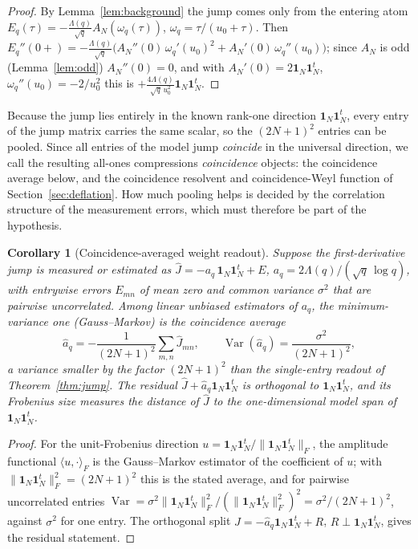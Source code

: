 \documentclass[11pt]{article}
\theoremstyle{plain}
\newtheorem{corollary}[theorem]{Corollary}
\theoremstyle{definition}
\theoremstyle{remark}
\newcommand{\one}{\mathbf 1}
\newcommand{\Lam}{\Lambda}
\begin{document}
\begin{proof}
By Lemma~\ref{lem:background} the jump comes only from the entering atom
$E_q(\tau)=-\tfrac{\Lam(q)}{\sqrt q}A_N(\omega_q(\tau))$, $\omega_q=\tau/(u_0+\tau)$.
Then $E_q''(0+)=-\tfrac{\Lam(q)}{\sqrt q}\bigl(A_N''(0)\,\omega_q'(u_0)^2+
A_N'(0)\,\omega_q''(u_0)\bigr)$; since $A_N$ is odd (Lemma~\ref{lem:odd})
$A_N''(0)=0$, and with $A_N'(0)=2\one_N\one_N^t$, $\omega_q''(u_0)=-2/u_0^2$ this is
$+\tfrac{4\Lam(q)}{\sqrt q\,u_0^2}\one_N\one_N^t$.
\end{proof}

Because the jump lies entirely in the known rank-one direction $\one_N\one_N^t$,
every entry of the jump matrix carries the same scalar, so the $(2N+1)^2$
entries can be pooled. Since all entries of the model jump \emph{coincide} in
the universal direction, we call the resulting all-ones compressions
\emph{coincidence} objects: the coincidence average below, and the coincidence
resolvent and coincidence-Weyl function of Section~\ref{sec:deflation}. How
much pooling helps is decided by the correlation
structure of the measurement errors, which must therefore be part of the
hypothesis.

\begin{corollary}[Coincidence-averaged weight readout]\label{cor:matched}
Suppose the first-derivative jump is measured or estimated as
$\widehat{J}=-a_q\,\one_N\one_N^t+E$, $a_q=2\Lam(q)/(\sqrt q\,\log q)$, with
entrywise errors $E_{mn}$ of mean zero and common variance $\sigma^2$ that are
\emph{pairwise uncorrelated}. Among linear unbiased estimators of $a_q$, the
minimum-variance one (Gauss--Markov) is the coincidence average
\[
        \widehat a_q=-\frac{1}{(2N+1)^2}\sum_{m,n}\widehat{J}_{mn},
        \qquad \operatorname{Var}(\widehat a_q)=\frac{\sigma^2}{(2N+1)^2},
\]
a variance smaller by the factor $(2N+1)^2$ than the single-entry readout of
Theorem~\ref{thm:jump}. The residual $\widehat{J}+\widehat a_q\one_N\one_N^t$ is
orthogonal to $\one_N\one_N^t$, and its Frobenius size measures the distance of
$\widehat{J}$ to the one-dimensional model span of $\one_N\one_N^t$.
\end{corollary}

\begin{proof}
For the unit-Frobenius direction $u=\one_N\one_N^t/\|\one_N\one_N^t\|_F$, the
amplitude functional $\langle u,\cdot\rangle_F$ is the Gauss--Markov estimator of
the coefficient of $u$; with $\|\one_N\one_N^t\|_F^2=(2N+1)^2$ this is the stated
average, and for pairwise uncorrelated entries
$\operatorname{Var}=\sigma^2\|\one_N\one_N^t\|_F^2/(\|\one_N\one_N^t\|_F^2)^2
=\sigma^2/(2N+1)^2$, against $\sigma^2$ for one entry. The orthogonal split
$\widehat{J}=-\widehat a_q\one_N\one_N^t+R$, $R\perp\one_N\one_N^t$, gives the
residual statement.
\end{proof}
\end{document}
